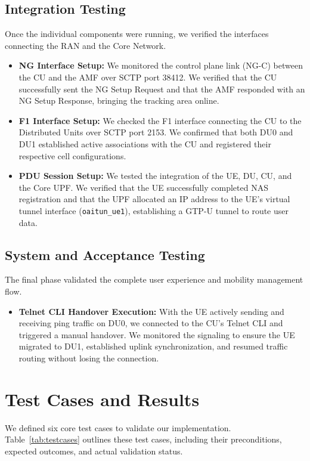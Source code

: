 \subsection{Integration Testing}
Once the individual components were running, we verified the interfaces connecting the RAN and the Core Network.
\begin{itemize}[leftmargin=*]
    \item \textbf{NG Interface Setup:} We monitored the control plane link (NG-C) between the CU and the AMF over SCTP port 38412. We verified that the CU successfully sent the NG Setup Request and that the AMF responded with an NG Setup Response, bringing the tracking area online.
    \item \textbf{F1 Interface Setup:} We checked the F1 interface connecting the CU to the Distributed Units over SCTP port 2153. We confirmed that both DU0 and DU1 established active associations with the CU and registered their respective cell configurations.
    \item \textbf{PDU Session Setup:} We tested the integration of the UE, DU, CU, and the Core UPF. We verified that the UE successfully completed NAS registration and that the UPF allocated an IP address to the UE's virtual tunnel interface (\texttt{oaitun\_ue1}), establishing a GTP-U tunnel to route user data.
\end{itemize}

\subsection{System and Acceptance Testing}
The final phase validated the complete user experience and mobility management flow.
\begin{itemize}[leftmargin=*]
    \item \textbf{Telnet CLI Handover Execution:} With the UE actively sending and receiving ping traffic on DU0, we connected to the CU's Telnet CLI and triggered a manual handover. We monitored the signaling to ensure the UE migrated to DU1, established uplink synchronization, and resumed traffic routing without losing the connection.
\end{itemize}

\section{Test Cases and Results}
\justify
We defined six core test cases to validate our implementation. Table~\ref{tab:testcases} outlines these test cases, including their preconditions, expected outcomes, and actual validation status.

